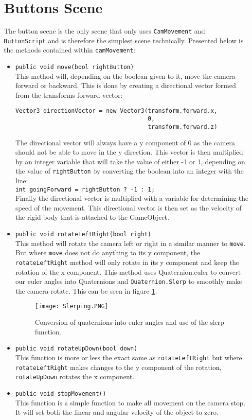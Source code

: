 \section{Buttons Scene}
The button scene is the only scene that only uses  {\tt CamMovement} and {\tt ButtonScript} and is therefore the simplest scene technically. Presented below is  the methods contained within {\tt camMovement}: 
\begin{itemize}
\item {\tt public void move(bool rightButton)}\\
This method will, depending on the boolean given to it, move the camera forward or backward. This is done by creating a directional vector formed from the transforms forward vector:
\begin{verbatim}
Vector3 directionVector = new Vector3(transform.forward.x, 
                                      0,
                                      transform.forward.z)
\end{verbatim}
The directional vector will always have a y component of 0 as the camera should not be able to move in the y direction. This vector is then multiplied by an integer variable that will take the value of either -1 or 1, depending on the value of {\tt rightButton} by converting the boolean into an integer with the line:\\
{\tt int goingForward = rightButton ? -1 : 1;}\\
Finally the directional vector is multiplied with a variable for determining the speed of the movement. This directional vector is then set as the velocity of the rigid body that is attached to the GameObject. 

\item {\tt public void rotateLeftRight(bool right)}\\
This method will rotate the camera left or right in a similar manner to {\tt move}. But where {\tt move} does not do anything to its y component, the {\tt rotateLeftRight} method will only rotate in its y component and keep the rotation of the x component. This method uses {Quaternion.euler } to convert our euler angles into Quaternions and {\tt Quaternion.Slerp} to smoothly make the camera rotate. This can be seen in figure \ref{Slerping}.
 
\begin{figure}[H]
\centering
\texttt{[image: Slerping.PNG]}
\caption{Conversion of quaternions into euler angles and use of the slerp function.}
\label{Slerping}
\end{figure}

\item {\tt public void rotateUpDown(bool down)}\\
This function is more or less the exact same as {\tt rotateLeftRight} but where {\tt rotateLeftRight} makes changes to the y component of the rotation, {\tt rotateUpDown} rotates the x component. 

\item {\tt public void stopMovement()}\\
This function is a simple function to make all movement on the camera stop. It will set both the linear and angular velocity of the object to zero.
\end{itemize}

